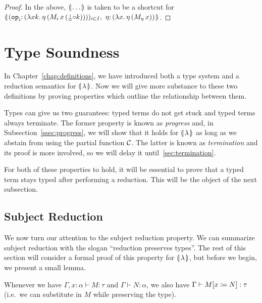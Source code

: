 \begin{proof}
  In the above, $\llparenthesis \, \ldots \, \rrparenthesis$ is taken to be a shortcut for
  $\banana{(\onto{\op{op}_i}{(\lam{x
        k}{\ap{\eta}{(\ap{\ap{M_i}{x}}{(\cherry \compop k)})}})})_{i \in I},\
    \onto{\eta}{(\lam{x}{\etaE{(\ap{M_\eta}{x})}})}}$.
\end{proof}


\section{Type Soundness}
\label{sec:type-soundness}

In Chapter~\ref{chap:definitions}, we have introduced both a type system
and a reduction semantics for $\llparenthesis \, \lambda \, \rrparenthesis$. Now we will give more
substance to these two definitions by proving properties which outline the
relationship between them.

Types can give us two guarantees: typed terms do not get stuck and typed
terms always terminate. The former property is known as \emph{progress}
and, in Subsection~\ref{ssec:progress}, we will show that it holds for
${\llparenthesis \, \lambda \, \rrparenthesis}$ as long as we abstain from using the partial function $\mathcal{C}$.  The
latter is known as \emph{termination} and its proof is more involved, so we
will delay it until~\ref{sec:termination}.

For both of these properties to hold, it will be essential to prove that a
typed term stays typed after performing a reduction. This will be the
object of the next subsection.


\subsection{Subject Reduction}
\label{ssec:subject-reduction}

We now turn our attention to the subject reduction property. We can
summarize subject reduction with the slogan ``reduction preserves
types''. The rest of this section will consider a formal proof of this
property for $\llparenthesis \, \lambda \, \rrparenthesis$, but before we begin, we present a small
lemma.

\begin{lemma}\label{lem:substitution-types}
  
  Whenever we have $\Gamma, x : \alpha \vdash M : \tau$ and
  $\Gamma \vdash N : \alpha$, we also have
  $\Gamma \vdash M[x \coloneqq N] : \tau$ (i.e.\ we can substitute in $M$
  while preserving the type).
\end{lemma}

